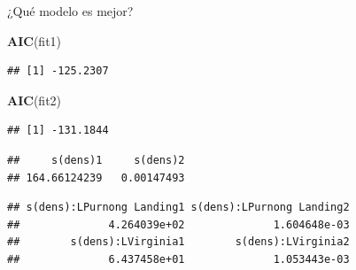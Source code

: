 \documentclass[]{book}
\newenvironment{Shaded}{\begin{snugshade}}{\end{snugshade}}
\newcommand{\KeywordTok}[1]{\textcolor[rgb]{0.13,0.29,0.53}{\textbf{#1}}}
\newcommand{\OperatorTok}[1]{\textcolor[rgb]{0.81,0.36,0.00}{\textbf{#1}}}
\newcommand{\NormalTok}[1]{#1}
\begin{document}
¿Qué modelo es mejor?

\begin{Shaded}
\begin{Highlighting}[]
\KeywordTok{AIC}\NormalTok{(fit1)}
\end{Highlighting}
\end{Shaded}

\begin{verbatim}
## [1] -125.2307
\end{verbatim}

\begin{Shaded}
\begin{Highlighting}[]
\KeywordTok{AIC}\NormalTok{(fit2)}
\end{Highlighting}
\end{Shaded}

\begin{verbatim}
## [1] -131.1844
\end{verbatim}

\begin{Shaded}
\end{Shaded}

\begin{verbatim}
##     s(dens)1     s(dens)2 
## 164.66124239   0.00147493
\end{verbatim}

\begin{Shaded}
\end{Shaded}

\begin{verbatim}
## s(dens):LPurnong Landing1 s(dens):LPurnong Landing2 
##              4.264039e+02              1.604648e-03 
##        s(dens):LVirginia1        s(dens):LVirginia2 
##              6.437458e+01              1.053443e-03
\end{verbatim}
\end{document}
